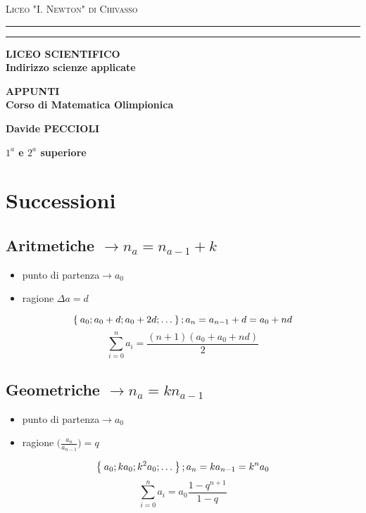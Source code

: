 \documentclass[12pt, a4paper,oneside]{book}
\begin{document}
\begin{titlepage}
	\begin{center}
		{{\Large{\textsc{Liceo "I. Newton" di Chivasso}}}} \rule[0.1cm]{15.8cm}{0.1mm}
		\rule[0.5cm]{15.8cm}{0.6mm}
		{\small{\bf LICEO SCIENTIFICO\\
				Indirizzo scienze applicate}}
	\end{center}
	\vspace{15mm}
	\begin{center}
		\vspace{5cm}
		{\LARGE{\bf APPUNTI}}\\
		\vspace{19mm} {\large{\bf Corso di Matematica Olimpionica}}
	\end{center}
	\vspace{50mm}
	\par
	\noindent
	\begin{minipage}[t]{0.47\textwidth}
		{\large{\bf Davide PECCIOLI}}
	\end{minipage}
	\hfill
	\vspace{3cm}
	\begin{center}
		{\large{\bf $1^a$ e $2^a$ superiore }}
	\end{center}
\end{titlepage}
\chapter{Successioni}
	\section{Aritmetiche  $\to n_a=n_{a-1}+k$}
	\begin{itemize}
	\item punto di partenza$\to a_0$
	\item ragione $\Delta a=d$
	\end{itemize}
	\[
	\Set{a_0;a_0+d;a_0+2d; \dots}; a_n=a_{n-1}+d=a_0+nd
	\]
	\[
	\sum_{i=0}^n a_i=\frac{(n+1)(a_0+a_0+nd)}{2}
	\]
	\section{Geometriche $\to n_a=kn_{a-1}$}
	\begin{itemize}
		\item punto di partenza$\to a_0$
		\item ragione $\bigl(\frac{a_n}{a_{n-1}}\bigr)=q$
	\end{itemize}
	\[
	\Set{a_0;ka_0;k^{2}a_0; \dots}; a_n=ka_{n-1}=k^{n}a_0
	\]
	\[
	\sum_{i=0}^{n}a_i=a_0\frac{1-q^{n+1}}{1-q}
	\]
\end{document}

